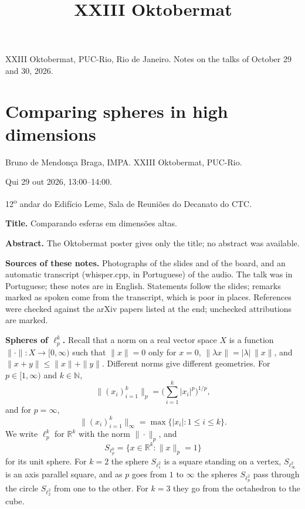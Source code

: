 



\title{XXIII Oktobermat}
\maketitle

\label{section-phantom}

\tableofcontents

XXIII Oktobermat, PUC-Rio, Rio de Janeiro.
Notes on the talks of October 29 and 30,
2026.


\section{Comparing spheres in high
dimensions}
\label{section-comparing-spheres}

\noindent
Bruno de Mendon\c{c}a Braga, IMPA.
XXIII Oktobermat, PUC-Rio.

Qui 29 out 2026, 13:00--14:00.

12\textsuperscript{o} andar do Edif\'icio
Leme, Sala de Reuni\~oes do Decanato do CTC.

\medskip\noindent
{\bf Title.} Comparando esferas em
dimens\~oes altas.

\medskip\noindent
{\bf Abstract.} The Oktobermat poster gives
only the title; no abstract was available.

\medskip\noindent
{\bf Sources of these notes.} Photographs of
the slides and of the board, and an
automatic transcript (whisper.cpp, in
Portuguese) of the audio. The talk was in
Portuguese; these notes are in English.
Statements follow the slides; remarks marked
as spoken come from the transcript, which is
poor in places. References were checked
against the arXiv papers listed at the end;
unchecked attributions are marked.

\medskip\noindent
{\bf Spheres of $\ell_p^k$.} Recall that a
norm on a real vector space $X$ is a function
$\|\cdot\| : X \to [0,\infty)$ such that
$\|x\| = 0$ only for $x = 0$,
$\|\lambda x\| = |\lambda|\,\|x\|$, and
$\|x+y\| \le \|x\| + \|y\|$. Different norms
give different geometries. For
$p \in [1,\infty)$ and $k \in \mathbb{N}$,
$$
\|(x_i)_{i=1}^k\|_p
= \Big(\sum_{i=1}^k |x_i|^p\Big)^{1/p},
$$
and for $p = \infty$,
$$
\|(x_i)_{i=1}^k\|_\infty
= \max\{|x_i| : 1 \le i \le k\}.
$$
We write $\ell_p^k$ for $\mathbb{R}^k$ with
the norm $\|\cdot\|_p$, and
$$
S_{\ell_p^k}
= \{x \in \mathbb{R}^k : \|x\|_p = 1\}
$$
for its unit sphere. For $k = 2$ the sphere
$S_{\ell_1^2}$ is a square standing on a
vertex, $S_{\ell_\infty^2}$ is an axis
parallel square, and as $p$ goes from $1$ to
$\infty$ the spheres $S_{\ell_p^2}$ pass
through the circle $S_{\ell_2^2}$ from one to
the other. For $k = 3$ they go from the
octahedron to the cube.

